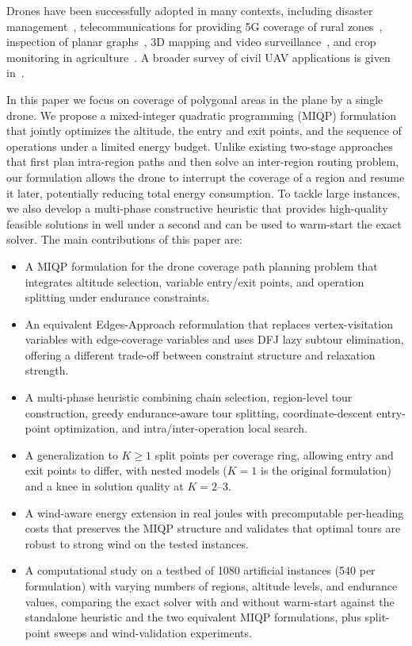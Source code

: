 \documentclass[12pt]{elsarticle}
\begin{document}
Drones have been successfully adopted in many contexts, including disaster management~\cite{art:Chiaraviglio19,art:shi2024}, telecommunications for providing 5G coverage of rural zones~\cite{art:Amorosi19}, inspection of planar graphs~\cite{art:Amorosi2024,art:Amorosi2021,art:Amorosi2023}, 3D mapping and video surveillance~\cite{art:Nexand14}, and crop monitoring in agriculture~\cite{art:Tokekaretal16}. A broader survey of civil UAV applications is given in~\cite{art:Otto18}.

In this paper we focus on coverage of polygonal areas in the plane by a single drone. We propose a mixed-integer quadratic programming (MIQP) formulation that jointly optimizes the altitude, the entry and exit points, and the sequence of operations under a limited energy budget. Unlike existing two-stage approaches that first plan intra-region paths and then solve an inter-region routing problem, our formulation allows the drone to interrupt the coverage of a region and resume it later, potentially reducing total energy consumption. To tackle large instances, we also develop a multi-phase constructive heuristic that provides high-quality feasible solutions in well under a second and can be used to warm-start the exact solver. The main contributions of this paper are:
\begin{itemize}
    \item A MIQP formulation for the drone coverage path planning problem that integrates altitude selection, variable entry/exit points, and operation splitting under endurance constraints.
    \item An equivalent Edges-Approach reformulation that replaces vertex-visitation variables with edge-coverage variables and uses DFJ lazy subtour elimination, offering a different trade-off between constraint structure and relaxation strength.
    \item A multi-phase heuristic combining chain selection, region-level tour construction, greedy endurance-aware tour splitting, coordinate-descent entry-point optimization, and intra/inter-operation local search.
    \item A generalization to $K\ge 1$ split points per coverage ring, allowing entry and exit points to differ, with nested models ($K=1$ is the original formulation) and a knee in solution quality at $K=2$--$3$.
    \item A wind-aware energy extension in real joules with precomputable per-heading costs that preserves the MIQP structure and validates that optimal tours are robust to strong wind on the tested instances.
    \item A computational study on a testbed of 1080 artificial instances (540 per formulation) with varying numbers of regions, altitude levels, and endurance values, comparing the exact solver with and without warm-start against the standalone heuristic and the two equivalent MIQP formulations, plus split-point sweeps and wind-validation experiments.
\end{itemize}
\end{document}
